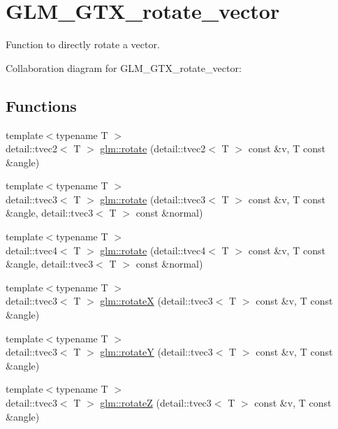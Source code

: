 \hypertarget{group__gtx__rotate__vector}{}\section{G\+L\+M\+\_\+\+G\+T\+X\+\_\+rotate\+\_\+vector}
\label{group__gtx__rotate__vector}


Function to directly rotate a vector.  


Collaboration diagram for G\+L\+M\+\_\+\+G\+T\+X\+\_\+rotate\+\_\+vector\+:
\subsection*{Functions}
\begin{DoxyCompactItemize}
\item 
{\footnotesize template$<$typename T $>$ }\\detail\+::tvec2$<$ T $>$ \hyperlink{group__gtx__rotate__vector_gab40685a29feeaa0b2ceb5b733421adcb}{glm\+::rotate} (detail\+::tvec2$<$ T $>$ const \&v, T const \&angle)
\item 
{\footnotesize template$<$typename T $>$ }\\detail\+::tvec3$<$ T $>$ \hyperlink{group__gtx__rotate__vector_gab556da0efabc9606f198f89a74cb1964}{glm\+::rotate} (detail\+::tvec3$<$ T $>$ const \&v, T const \&angle, detail\+::tvec3$<$ T $>$ const \&normal)
\item 
{\footnotesize template$<$typename T $>$ }\\detail\+::tvec4$<$ T $>$ \hyperlink{group__gtx__rotate__vector_ga6e2b5cddfb385e640dfcf1ae7769b910}{glm\+::rotate} (detail\+::tvec4$<$ T $>$ const \&v, T const \&angle, detail\+::tvec3$<$ T $>$ const \&normal)
\item 
{\footnotesize template$<$typename T $>$ }\\detail\+::tvec3$<$ T $>$ \hyperlink{group__gtx__rotate__vector_gaaadca0c077515d56955f3c662a3a3c7f}{glm\+::rotate\+X} (detail\+::tvec3$<$ T $>$ const \&v, T const \&angle)
\item 
{\footnotesize template$<$typename T $>$ }\\detail\+::tvec3$<$ T $>$ \hyperlink{group__gtx__rotate__vector_gacffa0ae7f32f4e2ee7bc1dc0ed290d45}{glm\+::rotate\+Y} (detail\+::tvec3$<$ T $>$ const \&v, T const \&angle)
\item 
{\footnotesize template$<$typename T $>$ }\\detail\+::tvec3$<$ T $>$ \hyperlink{group__gtx__rotate__vector_ga105c77751b4ab56c491334655751e0af}{glm\+::rotate\+Z} (detail\+::tvec3$<$ T $>$ const \&v, T const \&angle)

\end{DoxyCompactItemize}
